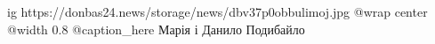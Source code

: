  
 
 
 
 

\ifcmt
  ig https://donbas24.news/storage/news/dbv37p0obbulimoj.jpg
  @wrap center
  @width 0.8
	@caption_here Марія і Данило Подибайло 
\fi
